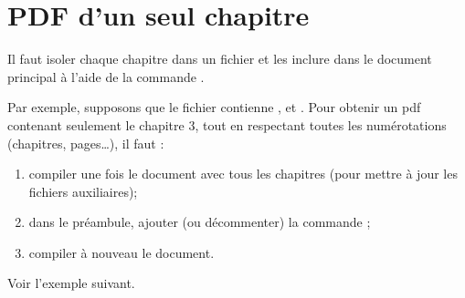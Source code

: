 \section{PDF d'un seul chapitre}
\label{sec:multidoc}

Il faut isoler chaque chapitre dans un fichier et les inclure dans le document principal à l'aide de la commande \texttt{}.

Par exemple, supposons que le fichier  contienne \texttt{}, \texttt{} et \texttt{}. Pour obtenir un pdf contenant seulement le chapitre 3, tout en respectant toutes les numérotations (chapitres, pages\dots), il faut :
\begin{enumerate}
	\item compiler une fois le document avec tous les chapitres (pour mettre à jour les fichiers auxiliaires);
	\item dans le préambule, ajouter (ou décommenter) la commande \texttt{};
	\item compiler à nouveau le document.
\end{enumerate}

Voir l'exemple suivant.





\newpage





